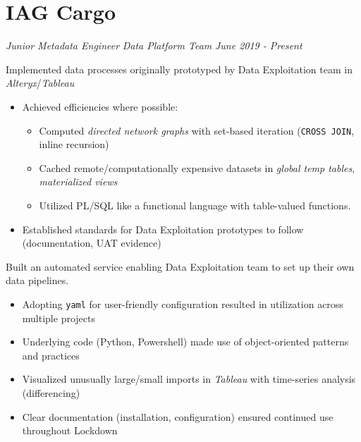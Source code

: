 \documentclass[../cv.tex]{subfiles}
\begin{document}
\section{IAG Cargo}
\textit{Junior Metadata Engineer}
\hfill
\textit{Data Platform Team}
\hfill
\textit{June 2019 - Present}
\begin{description}[style=multiline, leftmargin=3.5cm]
	\item[Prototype Implementation\\\textnormal{PL/SQL}] Implemented data processes originally prototyped by Data Exploitation team in \textit{Alteryx}/\textit{Tableau}
	      \begin{itemize}
		      \item Achieved efficiencies where possible:
		            \begin{itemize}
			            \item Computed \textit{directed network graphs} with set-based iteration (\texttt{CROSS JOIN}, inline recursion)
			            \item Cached remote/computationally expensive datasets in \textit{global temp tables}, \textit{materialized views}
			            \item Utilized PL/SQL like a functional language with table-valued functions.
		            \end{itemize}
		      \item Established standards for Data Exploitation prototypes to follow (documentation, UAT evidence)
	      \end{itemize}
	\item[Self-Service Pipeline Creation\\\textnormal{Python, Powershell}]
	      Built an automated service enabling Data Exploitation team to set up their own data pipelines.
	      \begin{itemize}
			  \item Adopting \texttt{yaml} for user-friendly configuration resulted in utilization across multiple projects
			  \item Underlying code (Python, Powershell) made use of object-oriented patterns and practices
		      \item Visualized unusually large/small imports in \textit{Tableau} with time-series analysis (differencing)
		     \item Clear documentation (installation, configuration) ensured continued use throughout Lockdown
	      \end{itemize}
	\item[Sales Relational Model\\ \textnormal{Oracle}]

\end{description}
\end{document}
